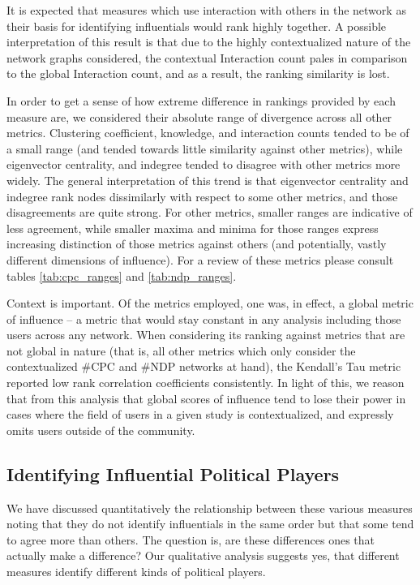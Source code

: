 \documentclass[a4paper,12pt]{article}
\begin{document}
It is expected that measures which use interaction with others in the network as their basis for identifying influentials would rank highly together. A possible interpretation of this result is that due to the highly contextualized nature of the network graphs considered, the contextual Interaction count pales in comparison to the global Interaction count, and as a result, the ranking similarity is lost.

In order to get a sense of how extreme difference in rankings provided by each measure are, we considered their absolute range of divergence across all other metrics. Clustering coefficient, knowledge, and interaction counts tended to be of a small range (and tended towards little similarity against other metrics), while eigenvector centrality, and indegree tended to disagree with other metrics more widely. The general interpretation of this trend is that eigenvector centrality and indegree rank nodes dissimilarly with respect to some other metrics, and those disagreements are quite strong. For other metrics, smaller ranges are indicative of less agreement, while smaller maxima and minima for those ranges express increasing distinction of those metrics against others (and potentially, vastly different dimensions of influence). For a review of these metrics please consult tables \ref{tab:cpc_ranges} and \ref{tab:ndp_ranges}.

Context is important. Of the metrics employed, one was, in effect, a global metric of influence -- a metric that would stay constant in any analysis including those users across any network. When considering its ranking against metrics that are not global in nature (that is, all other metrics which only consider the contextualized \#CPC and \#NDP networks at hand), the Kendall's Tau metric reported low rank correlation coefficients consistently. In light of this, we reason that from this analysis that global scores of influence tend to lose their power in cases where the field of users in a given study is contextualized, and expressly omits users outside of the community.

\subsection{Identifying Influential Political Players}

We have discussed quantitatively the relationship between these various measures noting that they do not identify influentials in the same order but that some tend to agree more than others. The question is, are these differences ones that actually make a difference? Our qualitative analysis suggests yes, that different measures identify different kinds of political players.
\end{document}
